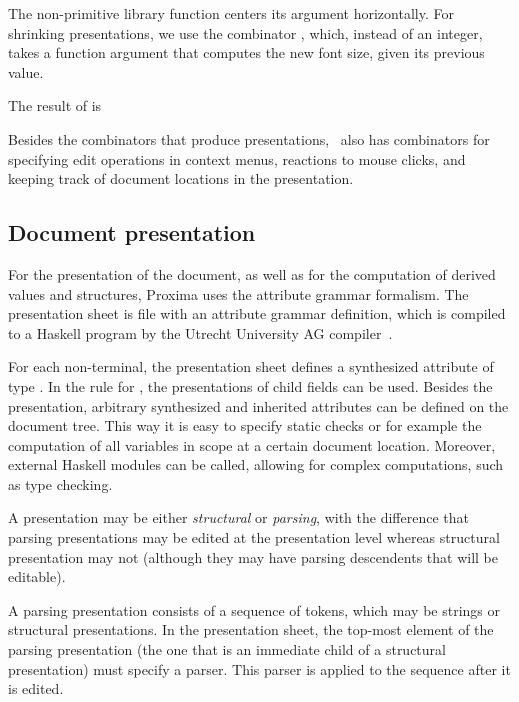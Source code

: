 \documentclass[12pt]{article}
\begin{document}
The non-primitive library function  centers its argument horizontally. For shrinking presentations, we use the combinator , which, instead of an integer, takes a function argument that computes the new font size, given its previous value.

The result of  is~~

Besides the combinators that produce presentations, \Xprez\ also has combinators for specifying edit operations in context menus, reactions to mouse clicks, and keeping track of document locations in the presentation.


\subsection{Document presentation}

For the presentation of the document, as well as for the computation of derived values and structures, Proxima uses the attribute grammar formalism. The presentation sheet is file with an attribute grammar definition, which is compiled to a Haskell program by the Utrecht University AG compiler~\cite{swierstra08ag}.

For each non-terminal, the presentation sheet defines a synthesized attribute  of type . In the rule for , the presentations of child fields can be used. Besides the presentation, arbitrary synthesized and inherited attributes can be defined on the document tree. This way it is easy to specify static checks or for example the computation of all variables in scope at a certain document location. Moreover, external Haskell modules can be called, allowing for complex computations, such as type checking.


A presentation may be either {\em structural} or {\em parsing}, with the difference that parsing presentations may be edited at the presentation level whereas structural presentation may not (although they may have parsing descendents that will be editable). 

A parsing presentation consists of a sequence of tokens, which may be strings or structural presentations. In the presentation sheet, the top-most element of the parsing presentation (the one that is an immediate child of a structural presentation) must specify a parser. This parser is applied to the sequence after it is edited.
\end{document}
